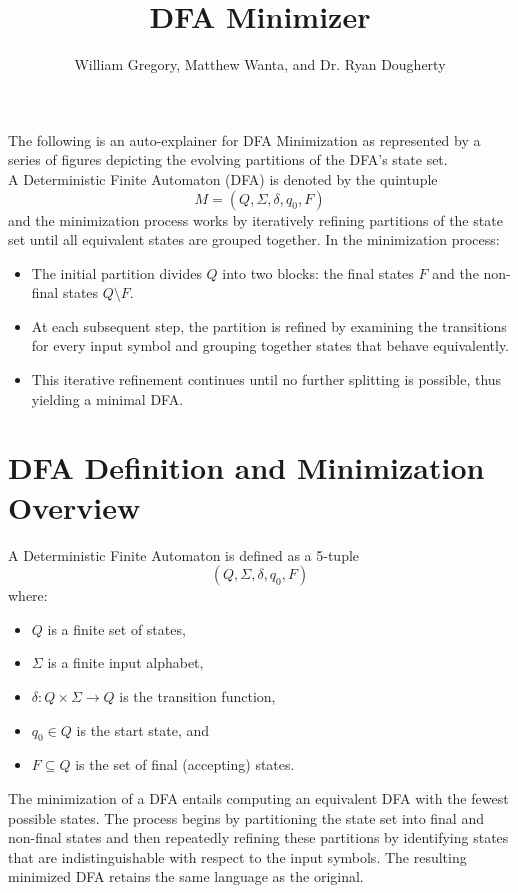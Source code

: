 


\title{\textbf{DFA Minimizer}}
\author{William Gregory, Matthew Wanta, and Dr. Ryan Dougherty}
\date{}
\maketitle
\thispagestyle{fancy}

The following is an auto-explainer for DFA Minimization as represented by a series of figures depicting the evolving partitions of the DFA’s state set. \\

A Deterministic Finite Automaton (DFA) is denoted by the quintuple
\[
M = (Q, \Sigma, \delta, q_0, F)
\]
and the minimization process works by iteratively refining partitions of the state set until all equivalent states are grouped together. In the minimization process:
\begin{itemize}
    \item The initial partition divides $Q$ into two blocks: the final states $F$ and the non-final states $Q \setminus F$.
    \item At each subsequent step, the partition is refined by examining the transitions for every input symbol and grouping together states that behave equivalently.
    \item This iterative refinement continues until no further splitting is possible, thus yielding a minimal DFA.
\end{itemize}

\section{DFA Definition and Minimization Overview}

A Deterministic Finite Automaton is defined as a 5-tuple 
\[
(Q, \Sigma, \delta, q_0, F)
\]
where:
\begin{itemize}
    \item $Q$ is a finite set of states,
    \item $\Sigma$ is a finite input alphabet,
    \item $\delta : Q \times \Sigma \rightarrow Q$ is the transition function,
    \item $q_0 \in Q$ is the start state, and
    \item $F \subseteq Q$ is the set of final (accepting) states.
\end{itemize}

The minimization of a DFA entails computing an equivalent DFA with the fewest possible states. The process begins by partitioning the state set into final and non-final states and then repeatedly refining these partitions by identifying states that are indistinguishable with respect to the input symbols. The resulting minimized DFA retains the same language as the original.
